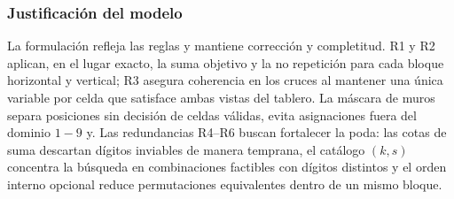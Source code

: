 \subsubsection*{Justificación del modelo}
La formulación refleja las reglas y mantiene corrección y completitud. R1 y R2 aplican, en el lugar exacto, la suma objetivo y la no repetición para cada bloque horizontal y vertical; R3 asegura coherencia en los cruces al mantener una única variable por celda que satisface ambas vistas del tablero. La máscara de muros separa posiciones sin decisión de celdas válidas, evita asignaciones fuera del dominio \(1\!-\!9\) y. Las redundancias R4–R6 buscan fortalecer la poda: las cotas de suma descartan dígitos inviables de manera temprana, el catálogo \((k,s)\) concentra la búsqueda en combinaciones factibles con dígitos distintos y el orden interno opcional reduce permutaciones equivalentes dentro de un mismo bloque.